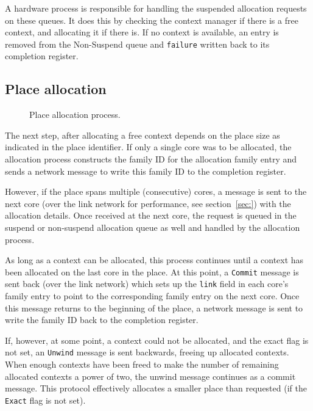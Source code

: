 A hardware process is responsible for handling the suspended allocation requests on these queues. It does this by checking the context manager if there is a free context, and allocating it if there is. If no context is available, an entry is removed from the Non-Suspend queue and {\tt failure} written back to its completion register. 

\subsection{Place allocation}

\begin{figure}
 \begin{center}
  
  \caption{Place allocation process.}
  \label{fig:place-allocation}
 \end{center}
\end{figure}

The next step, after allocating a free context depends on the place size as indicated in the place identifier. If only a single core was to be allocated, the allocation process constructs the family ID for the allocation family entry and sends a network message to write this family ID to the completion register.

However, if the place spans multiple (consecutive) cores, a message is sent to the next core (over the link network for performance, see section~\ref{sec:}) with the allocation details. Once received at the next core, the request is queued in the suspend or non-suspend allocation queue as well and handled by the allocation process.

As long as a context can be allocated, this process continues until a context has been allocated on the last core in the place. At this point, a {\tt Commit} message is sent back (over the link network) which sets up the {\tt link} field in each core's family entry to point to the corresponding family entry on the next core. Once this message returns to the beginning of the place, a network message is sent to write the family ID back to the completion register.

If, however, at some point, a context could not be allocated, and the exact flag is not set, an {\tt Unwind} message is sent backwards, freeing up allocated contexts. When enough contexts have been freed to make the number of remaining allocated contexts a power of two, the unwind message continues as a commit message. This protocol effectively allocates a smaller place than requested (if the {\tt Exact} flag is not set).

